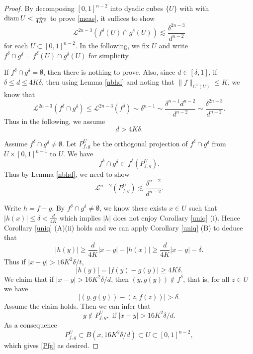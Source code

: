 \documentclass[11pt,a4paper,reqno]{amsart}
\newcommand{\calL}{\mathcal{L}}
\newcommand{\1}{\mathbf{1}}
\numberwithin{equation}{section}
\theoremstyle{plain}
\theoremstyle{definition}
\theoremstyle{remark}
\begin{document}
\begin{proof}
By
decomposing $[0,1]^{n-2}$ into dyadic cubes $\{U\}$ with with ${\rm diam \, } U < \frac{1}{4K^2}$ to prove \eqref{meas}, it suffices to show
$$ \calL^{2n-3}(f^\delta(U) \cap g^\delta(U)) \lesssim \frac{\delta^{2n-3}}{d^{n-2}}   $$
for each $U \subset[0,1]^{n-2}$.
In the following, we fix $U$ and write $f^\delta \cap g^\delta = f^\delta(U) \cap g^\delta(U)$ for simplicity.

  If $f^\delta \cap g^\delta = \emptyset$, then there is nothing to prove. Also, since $d \in [\delta,1]$, if $\delta \le d \le 4K\delta$,
   then using Lemma \ref{nbhd} and noting that $\|f\|_{C^1(U)} \le K$, we know that
   $$\calL^{2n-3}(f^\delta \cap g^\delta) \le \calL^{2n-3}(f^\delta) \sim \delta^{n-1} \sim \frac{\delta^{n-1}d^{n-2}}{d^{n-2}} \sim \frac{\delta^{2n-3}}{d^{n-2}} .$$
Thus in the following, we assume
\begin{equation}\label{ass1}
  d > 4K\delta.
\end{equation}



  Assume $f^\delta \cap g^\delta \ne \emptyset$.
  Let $P_{f,g}^U$ be the orthogonal projection of
  $f^\delta \cap g^\delta$ from $U \times [0,1]^{n-1}$ to $U$.
  We have
  $$ f^\delta \cap g^\delta \subset f^\delta(P_{f,g}^U). $$
  Thus
 by Lemma \ref{nbhd},
 we need to show
  \begin{equation}\label{Pfg}
   \mathcal{L}^{n-2} (P_{f,g}^U) \lesssim \frac{\delta^{n-2}}{d^{n-2}}.
  \end{equation}


  Write $h=f-g$. By $f^\delta \cap g^\delta \ne \emptyset$, we know there exists $x \in U$ such that $|h(x)|\le \delta < \frac{d}{4K}$ which implies $|h|$ does not enjoy Corollary \ref{uniq} (i).
  Hence Corollary \ref{uniq} (A)(ii) holds and
  we can apply Corollary \eqref{uniq} (B) to deduce that
  $$ |h(y)| \ge \frac{d}{4K} |x-y| - |h(x)| \ge \frac{d}{4K} |x-y| -\delta.  $$
  Thus if $|x-y| > 16K^2\delta/t$,
  \begin{equation}\label{hy}
    |h(y)| = |f(y)-g(y)| \ge 4K\delta.
  \end{equation}
  We claim that if $|x-y| > 16K^2\delta/d$, then $(y,g(y)) \notin f^\delta$, that is, for all $z \in U$ we have
  \begin{equation}\label{cl1}
    |(y,g(y)) - (z,f(z))| > \delta.
  \end{equation}
  Assume the claim holds. Then we can infer that
  $$   y \notin P_{f,g}^U, \mbox{ if }|x-y| > 16K^2\delta/d.  $$
  As a consequence
  \begin{equation}\label{ball}
    P_{f,g}^U \subset B(x,16K^2\delta/d ) \subset U \subset [0,1]^{n-2},
  \end{equation}
  which gives \eqref{Pfg} as desired.


\end{proof}
\end{document}
